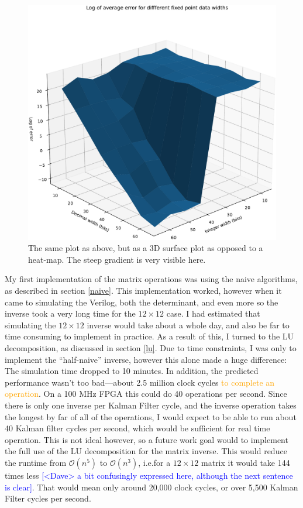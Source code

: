 \documentclass[12pt]{article}
\newcommand{\note}[2][red]{\textcolor{#1}{#2}}
\newcommand{\notedme}[1]{\note[blue]{[<Dave> #1]}}
\newcommand{\change}[2][]{\textcolor{orange}{#2}}
\begin{document}
\begin{figure}[thp]
	\centering
	
	\includegraphics[width=\textwidth]{sfc_plot_full.pdf}
	
	\caption{The same plot as above, but as a 3D surface plot as opposed to a heat-map. The steep gradient is very visible here.}
	\label{full_sfc}
\end{figure}

My first implementation of the matrix operations was using the naive algorithms, as described in section \ref{naive}. This implementation worked, however when it came to simulating the Verilog, both the determinant, and even more so the inverse took a very long time for the $12 \times 12$ case. I had estimated that simulating the $12 \times 12$ inverse would take about a whole day, and also be far to time consuming to implement in practice. As a result of this, I turned to the LU decomposition, as discussed in section \ref{lu}. Due to time constraints, I was only to implement the ``half-naive'' inverse, however this alone made a huge difference: The simulation time dropped to 10 minutes. In addition, the predicted performance wasn't too bad---about 2.5 million clock cycles \change{to complete an operation}. On a 100 MHz FPGA this could do 40 operations per second. Since there is only one inverse per Kalman Filter cycle, and the inverse operation takes the longest by far of all of the operations, I would expect to be able to run about 40 Kalman filter cycles per second, which would be sufficient for real time operation. This is not ideal however, so a future work goal would to implement the full use of the LU decomposition for the matrix inverse. This would reduce the runtime from $\mathcal{O}(n^5)$ to $\mathcal{O}(n^3)$, i.e.\@ for a $12 \times 12$ matrix it would take 144 times less \notedme{a bit confusingly expressed here, although the next sentence is clear}. That would mean only around 20,000 clock cycles, or over 5,500 Kalman Filter cycles per second. 
\end{document}
